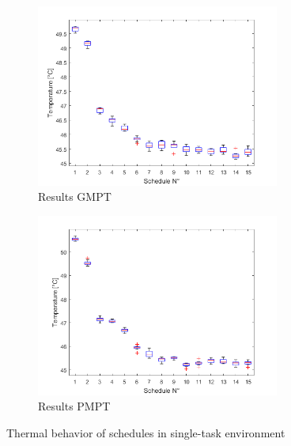 \begin{figure}[H]
\begin{subfigure}{.5\textwidth}
  \centering
  \includegraphics[height=6cm]{figures/gmpt_s_pi}
  \caption{Results GMPT}
  \label{fig:i_evgs_pi}
\end{subfigure}%
\begin{subfigure}{.5\textwidth}
  \centering
  \includegraphics[height=6cm]{figures/pmpt_s_pi}
  \caption{Results PMPT}
  \label{fig:i_evps_pi}
\end{subfigure}
\caption[Results Single-Task Raspberry]{Thermal behavior of schedules in single-task environment}
\label{fig:i_eva_gp_s_pi}
\end{figure}